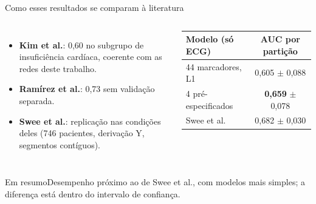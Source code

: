 \documentclass[10pt,aspectratio=169]{beamer}
\newcommand{\msg}[1]{\par\vfill\begin{block}{Em resumo}#1\end{block}}
\begin{document}
\begin{frame}{Como esses resultados se comparam à literatura}
  \begin{columns}[T]
    \small
    \begin{itemize}
      \item \textbf{Kim et al.}: 0,60 no subgrupo de insuficiência cardíaca,
        coerente com as redes deste trabalho.
      \item \textbf{Ramírez et al.}: 0,73 sem validação separada.
      \item \textbf{Swee et al.}: replicação nas condições deles (746
        pacientes, derivação Y, segmentos contíguos).
    \end{itemize}
    \centering
    \scriptsize
    \begin{tabular}{lc}
      \toprule
      Modelo (só ECG) & AUC por partição \\
      \midrule
      44 marcadores, L1 & 0,605 $\pm$ 0,088 \\
      4 pré-especificados & \textbf{0,659} $\pm$ 0,078 \\
      Swee et al. & 0,682 $\pm$ 0,030 \\
      \bottomrule
    \end{tabular}
  \end{columns}
  \msg{Desempenho próximo ao de Swee et al., com modelos mais simples; a
    diferença está dentro do intervalo de confiança.}
\end{frame}
\end{document}
